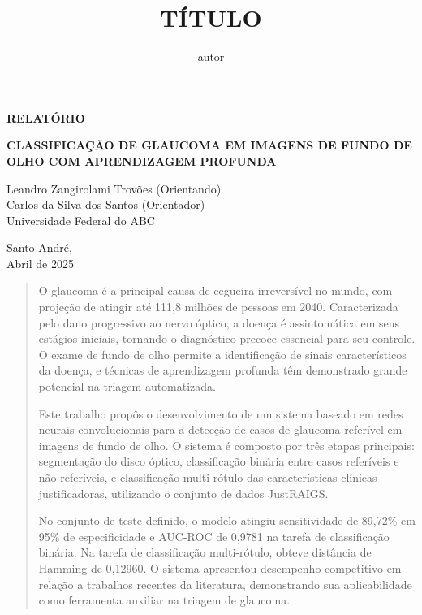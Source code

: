 \documentclass[12pt]{article}
\title{TÍTULO}
\author{autor}
\begin{document}
\thispagestyle{empty}
    \begin{flushright}
        \begin{huge}
            \textbf{RELATÓRIO}\\[3,5cm]
        \end{huge}
{\bf \LARGE  CLASSIFICAÇÃO DE GLAUCOMA EM IMAGENS DE FUNDO DE OLHO COM APRENDIZAGEM PROFUNDA}

\bigskip
        
        Leandro Zangirolami Trovões (Orientando)\\
        Carlos da Silva dos Santos (Orientador)\\
        Universidade Federal do ABC\\[5,5cm]
    \end{flushright}

    \vfill
    
    \begin{center}
        Santo André,\\
        Abril de 2025
    \end{center}
    
\newpage


\begin{center}
\end{center}

\begin{quote}
O glaucoma é a principal causa de cegueira irreversível no mundo, com projeção de atingir até 111,8 milhões de pessoas em 2040. Caracterizada pelo dano progressivo ao nervo óptico, a doença é assintomática em seus estágios iniciais, tornando o diagnóstico precoce essencial para seu controle. O exame de fundo de olho permite a identificação de sinais característicos da doença, e técnicas de aprendizagem profunda têm demonstrado grande potencial na triagem automatizada.

Este trabalho propôs o desenvolvimento de um sistema baseado em redes neurais convolucionais para a detecção de casos de glaucoma referível em imagens de fundo de olho. O sistema é composto por três etapas principais: segmentação do disco óptico, classificação binária entre casos referíveis e não referíveis, e classificação multi-rótulo das características clínicas justificadoras, utilizando o conjunto de dados JustRAIGS.

No conjunto de teste definido, o modelo atingiu sensitividade de 89,72\% em 95\% de especificidade e AUC-ROC de 0,9781 na tarefa de classificação binária. Na tarefa de classificação multi-rótulo, obteve distância de Hamming de 0,12960. O sistema apresentou desempenho competitivo em relação a trabalhos recentes da literatura, demonstrando sua aplicabilidade como ferramenta auxiliar na triagem de glaucoma.
\end{quote}
\end{document}
